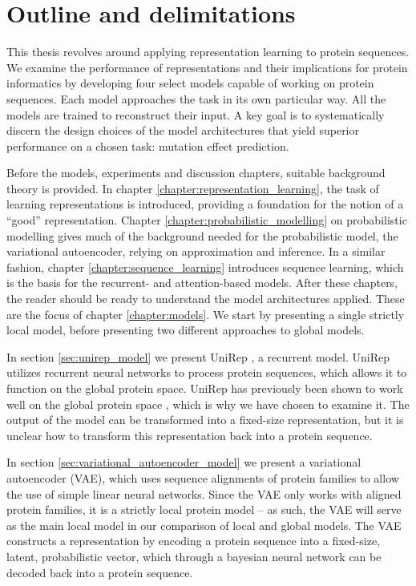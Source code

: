 \section{Outline and delimitations}
This thesis revolves around applying representation learning to protein sequences. We examine the performance of representations and their implications for protein informatics by developing four select models capable of working on protein sequences. Each model approaches the task in its own particular way. All the models are trained to reconstruct their input. A key goal is to systematically discern the design choices of the model architectures that yield superior performance on a chosen task: mutation effect prediction.

Before the models, experiments and discussion chapters, suitable background theory is provided. In chapter \ref{chapter:representation_learning}, the task of learning representations is introduced, providing a foundation for the notion of a ``good'' representation. Chapter \ref{chapter:probabilistic_modelling} on probabilistic modelling gives much of the background needed for the probabilistic model, the variational autoencoder, relying on approximation and inference. In a similar fashion, chapter \ref{chapter:sequence_learning} introduces sequence learning, which is the basis for the recurrent- and attention-based models. After these chapters, the reader should be ready to understand the model architectures applied. These are the focus of chapter \ref{chapter:models}. We start by presenting a single strictly local model, before presenting two different approaches to global models.


In section \ref{sec:unirep_model} we present UniRep \cite{alley2019unified}, a recurrent model. UniRep utilizes recurrent neural networks to process protein sequences, which allows it to function on the global protein space. UniRep has previously been shown to work well on the global protein space \cite{alley2019unified}, which is why we have chosen to examine it. The output of the model can be transformed into a fixed-size representation, but it is unclear how to transform this representation back into a protein sequence.

In section \ref{sec:variational_autoencoder_model} we present a variational autoencoder (VAE), which uses sequence alignments of protein families to allow the use of simple linear neural networks. Since the VAE only works with aligned protein families, it is a strictly local protein model -- as such, the VAE will serve as the main local model in our comparison of local and global models. The VAE constructs a representation by encoding a protein sequence into a fixed-size, latent, probabilistic vector, which through a bayesian neural network can be decoded back into a protein sequence.

